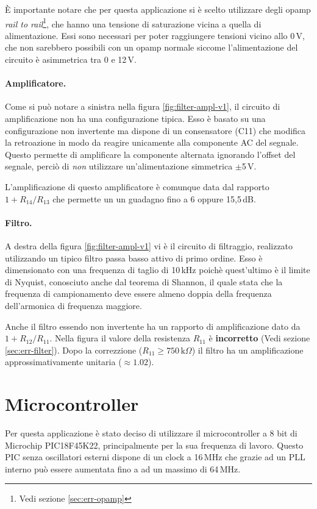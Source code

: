 \`E importante notare che per questa applicazione si \`e scelto utilizzare
degli opamp \emph{rail to rail}\footnote{Vedi sezione \ref{sec:err-opamp}},
che hanno una tensione di saturazione vicina a quella di alimentazione. Essi
sono necessari per poter raggiungere tensioni vicino allo 0\,V, che non
sarebbero possibili con un opamp normale siccome l'alimentazione del circuito
\`e asimmetrica tra 0 e 12\,V.

\paragraph{Amplificatore.} Come si pu\`o notare a sinistra nella figura
\ref{fig:filter-ampl-v1}, il circuito di amplificazione non ha una configurazione
tipica. Esso \`e basato su una configurazione non invertente ma dispone di un
consensatore (C11) che modifica la retroazione in modo da reagire unicamente
alla componente AC del segnale. Questo permette di amplificare la componente
alternata ignorando l'offset del segnale, perci\`o di \emph{non} utilizzare
un'alimentazione simmetrica \(\pm\)5\,V.

L'amplificazione di questo amplificatore \`e comunque data dal rapporto
\(1+R_{14}/R_{13}\) che permette un un guadagno fino a 6 oppure 15,5\,dB.

\paragraph{Filtro.} A destra della figura \ref{fig:filter-ampl-v1} vi \`e il
circuito di filtraggio, realizzato utilizzando un tipico filtro passa basso
attivo di primo ordine. Esso \`e dimensionato con una frequenza di taglio di
10\,kHz poich\`e quest'ultimo \`e il limite di Nyquist, conosciuto anche dal
teorema di Shannon, il quale stata che la frequenza di campionamento deve
essere almeno doppia della frequenza dell'armonica di frequenza maggiore.

Anche il filtro essendo non invertente ha un rapporto di amplificazione dato
da \(1+R_{12}/R_{11}\). Nella figura il valore della resistenza \(R_{11}\) \`e
\textbf{incorretto} (Vedi sezione \ref{sec:err-filter}). Dopo la correzzione
(\(R_{11} \geq 750\,\textrm{k}\Omega\)) il filtro ha un amplificazione
approssimativamente unitaria (\(\approx 1.02\)).

\section{Microcontroller}
Per questa applicazione \`e stato deciso di utilizzare il microcontroller a 8
bit di Microchip PIC18F45K22, principalmente per la sua frequenza di lavoro.
Questo PIC senza oscillatori esterni dispone di un clock a 16\,MHz che grazie
ad un PLL interno pu\`o essere aumentata fino a ad un massimo di 64\,MHz.

